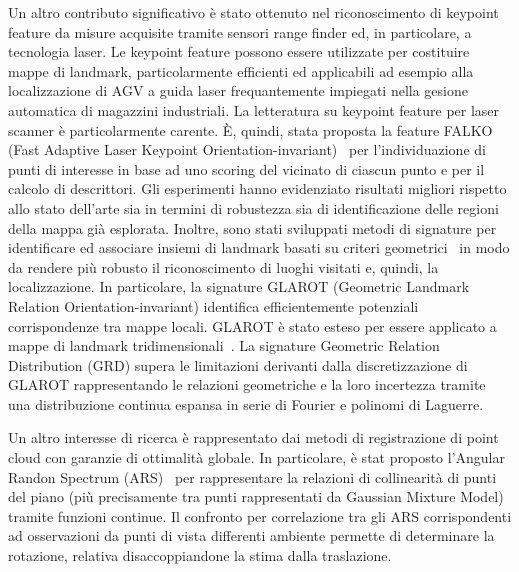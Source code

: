 \documentclass[11pt]{article}
\begin{document}
\begin{itemize}

Un altro contributo significativo \`e stato ottenuto nel riconoscimento di keypoint feature da misure acquisite tramite sensori range finder ed, in particolare, a tecnologia laser. 
Le keypoint feature possono essere utilizzate per costituire mappe di landmark, particolarmente efficienti ed applicabili ad esempio alla localizzazione di AGV a guida laser frequantemente impiegati nella gesione automatica di magazzini industriali. 
La letteratura su keypoint feature per laser scanner \`e particolarmente carente. 
\`E, quindi, stata proposta la feature FALKO (Fast Adaptive Laser Keypoint Orientation-invariant)~\cite{kallasi2016ral} per l'individuazione di punti di interesse in base ad uno scoring del vicinato di ciascun punto e per il calcolo di descrittori. 
Gli esperimenti hanno evidenziato risultati migliori rispetto allo stato dell'arte sia in termini di robustezza sia di identificazione delle regioni della mappa gi\`a esplorata. 
Inoltre, sono stati sviluppati metodi di signature per identificare ed associare insiemi di landmark basati su criteri geometrici~\cite{lodirizzini2019ral, lodirizzini2017iros, kallasi2016iros} in modo da rendere pi\`u robusto il riconoscimento di luoghi visitati e, quindi, la localizzazione. 
In particolare, la signature GLAROT (Geometric Landmark Relation Orientation-invariant) identifica efficientemente potenziali corrispondenze tra mappe locali. 
GLAROT \`e stato esteso per essere applicato a mappe di landmark tridimensionali~\cite{lodirizzini2017iros}. 
La signature Geometric Relation Distribution (GRD) supera le limitazioni derivanti dalla discretizzazione di GLAROT rappresentando le relazioni geometriche e la loro incertezza tramite una distribuzione continua espansa in serie di Fourier e polinomi di Laguerre. 

Un altro interesse di ricerca \`e rappresentato dai metodi di registrazione di point cloud con garanzie di ottimalit\`a globale. 
In particolare, \`e stat proposto l'Angular Randon Spectrum (ARS)~\cite{lodirizzini2018pr} per rappresentare la relazioni di collinearit\`a di punti del piano (pi\`u precisamente tra punti rappresentati da Gaussian Mixture Model) tramite funzioni continue. 
Il confronto per correlazione tra gli ARS corrispondenti ad osservazioni da punti di vista differenti ambiente permette di determinare la rotazione, relativa disaccoppiandone la stima dalla traslazione. 


\end{itemize}
\end{document}
